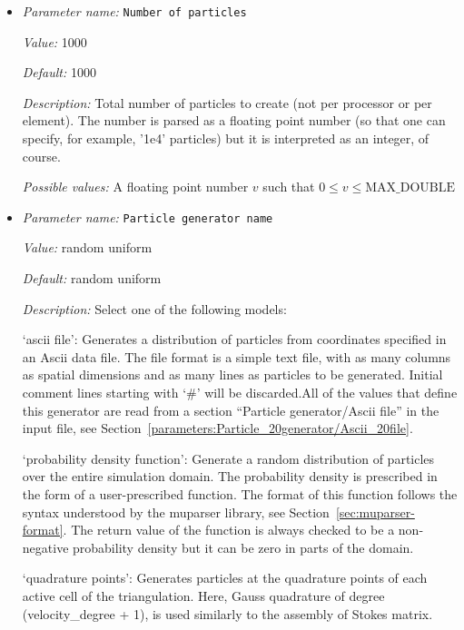 \begin{itemize}
{\it Possible values:} An integer $n$ such that $0\leq n \leq 2147483647$
\item {\it Parameter name:} {\tt Number of particles}
\label{parameters:Postprocess/Particles/Number of particles}


{\it Value:} 1000


{\it Default:} 1000


{\it Description:} Total number of particles to create (not per processor or per element). The number is parsed as a floating point number (so that one can specify, for example, '1e4' particles) but it is interpreted as an integer, of course.


{\it Possible values:} A floating point number $v$ such that $0 \leq v \leq \text{MAX\_DOUBLE}$
\item {\it Parameter name:} {\tt Particle generator name}
\label{parameters:Postprocess/Particles/Particle generator name}


{\it Value:} random uniform


{\it Default:} random uniform


{\it Description:} Select one of the following models:

`ascii file': Generates a distribution of particles from coordinates specified in an Ascii data file. The file format is a simple text file, with as many columns as spatial dimensions and as many lines as particles to be generated. Initial comment lines starting with `\#' will be discarded.All of the values that define this generator are read from a section ``Particle generator/Ascii file'' in the input file, see Section~\ref{parameters:Particle_20generator/Ascii_20file}.

`probability density function': Generate a random distribution of particles over the entire simulation domain. The probability density is prescribed in the form of a user-prescribed function. The format of this function follows the syntax understood by the muparser library, see Section~\ref{sec:muparser-format}. The return value of the function is always checked to be a non-negative probability density but it can be zero in parts of the domain.

`quadrature points': Generates particles at the quadrature points of each active cell of the triangulation. Here, Gauss quadrature of degree (velocity\_degree + 1), is used similarly to the assembly of Stokes matrix.


\end{itemize}

